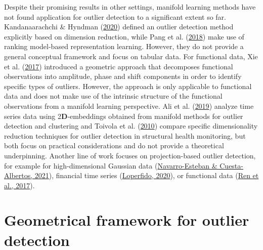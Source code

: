 \documentclass[
  10pt]{article}
\newcommand{\vizdim}{\mathbf{D}}        %
\begin{document}
Despite their promising results in other settings, manifold learning methods have not found application for outlier detection to a significant extent so far. Kandanaarachchi \& Hyndman (\protect\hyperlink{ref-kandanaarachchi2020dimension}{2020}) defined an outlier detection method explicitly based on dimension reduction, while Pang et al. (\protect\hyperlink{ref-pang2018learning}{2018}) make use of ranking model-based representation learning. However, they do not provide a general conceptual framework and focus on tabular data. For functional data, Xie et al. (\protect\hyperlink{ref-xie2017geometric}{2017}) introduced a geometric approach that decomposes functional observations into amplitude, phase and shift components in order to identify specific types of outliers. However, the approach is only applicable to functional data and does not make use of the intrinsic structure of the functional observations from a manifold learning perspective. Ali et al. (\protect\hyperlink{ref-ali2019timecluster}{2019}) analyze time series data using 2\(\vizdim\)-embeddings obtained from manifold methods for outlier detection and clustering and Toivola et al. (\protect\hyperlink{ref-toivola2010novelty}{2010}) compare specific dimensionality reduction techniques for outlier detection in structural health monitoring, but both focus on practical considerations and do not provide a theoretical underpinning. Another line of work focuses on projection-based outlier detection, for example for high-dimensional Gaussian data (\protect\hyperlink{ref-navarro2021high}{Navarro-Esteban \& Cuesta-Albertos, 2021}), financial time series (\protect\hyperlink{ref-loperfido2020kurtosis}{Loperfido, 2020}), or functional data (\protect\hyperlink{ref-ren2017projection}{Ren et al., 2017}).

\hypertarget{sec:framework}{%
\section{Geometrical framework for outlier detection}\label{sec:framework}}
\end{document}
